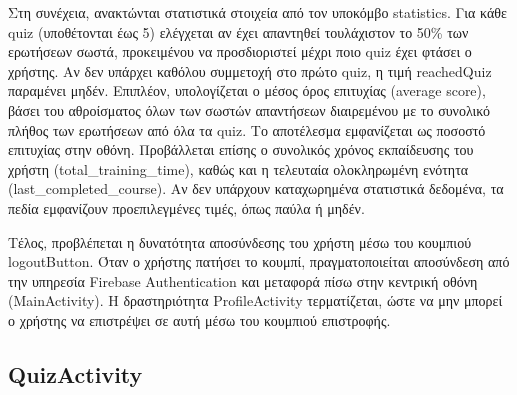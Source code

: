 \documentclass[11pt]{report}
\begin{document}
Στη συνέχεια, ανακτώνται στατιστικά στοιχεία από τον υποκόμβο statistics. Για κάθε quiz (υποθέτονται έως 5) ελέγχεται αν έχει απαντηθεί τουλάχιστον το 50\% των ερωτήσεων σωστά, προκειμένου να προσδιοριστεί μέχρι ποιο quiz έχει φτάσει ο χρήστης. Αν δεν υπάρχει καθόλου συμμετοχή στο πρώτο quiz, η τιμή reachedQuiz παραμένει μηδέν. Επιπλέον, υπολογίζεται ο μέσος όρος επιτυχίας (average score), βάσει του αθροίσματος όλων των σωστών απαντήσεων διαιρεμένου με το συνολικό πλήθος των ερωτήσεων από όλα τα quiz. Το αποτέλεσμα εμφανίζεται ως ποσοστό επιτυχίας στην οθόνη. Προβάλλεται επίσης ο συνολικός χρόνος εκπαίδευσης του χρήστη (total\_training\_time), καθώς και η τελευταία ολοκληρωμένη ενότητα (last\_completed\_course). Αν δεν υπάρχουν καταχωρημένα στατιστικά δεδομένα, τα πεδία εμφανίζουν προεπιλεγμένες τιμές, όπως παύλα ή μηδέν.

Τέλος, προβλέπεται η δυνατότητα αποσύνδεσης του χρήστη μέσω του κουμπιού logoutButton. Όταν ο χρήστης πατήσει το κουμπί, πραγματοποιείται αποσύνδεση από την υπηρεσία Firebase Authentication και μεταφορά πίσω στην κεντρική οθόνη (MainActivity). Η δραστηριότητα ProfileActivity τερματίζεται, ώστε να μην μπορεί ο χρήστης να επιστρέψει σε αυτή μέσω του κουμπιού επιστροφής.

\subsection{QuizActivity}
\end{document}
